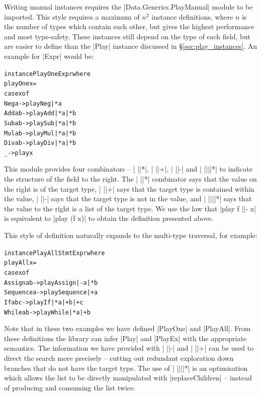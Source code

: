 \documentclass[preprint]{sigplanconf}
\newenvironment{code}{\begin{alltt}\small}{\end{alltt}}
\begin{document}
Writing manual instances requires the |Data.Generics.PlayManual| module to be imported. This style requires a maximum of $n^2$ instance definitions, where $n$ is the number of types which contain each other, but gives the highest performance and most type-safety. These instances still depend on the type of each field, but are easier to define than the |Play| instance discussed in \S\ref{sec:play_instances}. An example for |Expr| would be:

\begin{code}
instance PlayOne Expr where
    playOne x =
        case x of
            Neg  a    -> play Neg  |* a
            Add  a b  -> play Add  |* a |* b
            Sub  a b  -> play Sub  |* a |* b
            Mul  a b  -> play Mul  |* a |* b
            Div  a b  -> play Div  |* a |* b
            _         -> play x
\end{code}

This module provides four combinators -- | ||*|, | ||+|, | ||-| and | ||||*| to indicate the structure of the field to the right. The | ||*| combinator says that the value on the right is of the target type, | ||+| says that the target type is contained within the value, | ||-| says that the target type is not in the value, and | ||||*| says that the value to the right is a list of the target type. We use the law that |play f ||- x| is equivalent to |play (f x)| to obtain the definition presented above.

This style of definition naturally expands to the multi-type traversal, for example:

\begin{code}
instance PlayAll Stmt Expr where
    playAll x =
        case x of
            Assign    a b    -> play Assign    |-  a |*  b
            Sequence  a      -> play Sequence  |+  a
            If        a b c  -> play If        |*  a |+  b |+ c
            While     a b    -> play While     |*  a |+  b
\end{code}

Note that in these two examples we have defined |PlayOne| and |PlayAll|. From these definitions the library can infer |Play| and |PlayEx| with the appropriate semantics. The information we have provided with | ||-| and | ||+| can be used to direct the search more precisely -- cutting out redundant exploration down branches that do not have the target type. The use of | ||||*| is an optimisation which allows the list to be directly manipulated with |replaceChildren| -- instead of producing and consuming the list twice.
\end{document}
